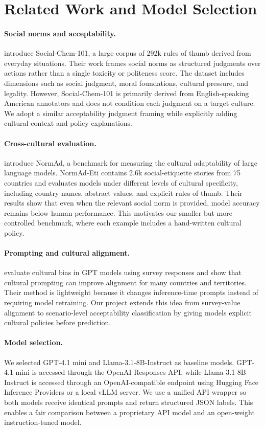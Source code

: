 \documentclass[11pt]{article}
\begin{document}
\section{Related Work and Model Selection}
\paragraph{Social norms and acceptability.}
\citet{forbes2020socialchemistry} introduce Social-Chem-101, a large corpus of 292k rules of thumb derived from everyday situations. Their work frames social norms as structured judgments over actions rather than a single toxicity or politeness score. The dataset includes dimensions such as social judgment, moral foundations, cultural pressure, and legality. However, Social-Chem-101 is primarily derived from English-speaking American annotators and does not condition each judgment on a target culture. We adopt a similar acceptability judgment framing while explicitly adding cultural context and policy explanations.

\paragraph{Cross-cultural evaluation.}
\citet{rao2025normad} introduce NormAd, a benchmark for measuring the cultural adaptability of large language models. NormAd-Eti contains 2.6k social-etiquette stories from 75 countries and evaluates models under different levels of cultural specificity, including country names, abstract values, and explicit rules of thumb. Their results show that even when the relevant social norm is provided, model accuracy remains below human performance. This motivates our smaller but more controlled benchmark, where each example includes a hand-written cultural policy.

\paragraph{Prompting and cultural alignment.}
\citet{tao2024cultural} evaluate cultural bias in GPT models using survey responses and show that cultural prompting can improve alignment for many countries and territories. Their method is lightweight because it changes inference-time prompts instead of requiring model retraining. Our project extends this idea from survey-value alignment to scenario-level acceptability classification by giving models explicit cultural policies before prediction.

\paragraph{Model selection.}
We selected GPT-4.1 mini and Llama-3.1-8B-Instruct as baseline models. GPT-4.1 mini is accessed through the OpenAI Responses API, while Llama-3.1-8B-Instruct is accessed through an OpenAI-compatible endpoint using Hugging Face Inference Providers or a local vLLM server. We use a unified API wrapper so both models receive identical prompts and return structured JSON labels. This enables a fair comparison between a proprietary API model and an open-weight instruction-tuned model.
\end{document}
